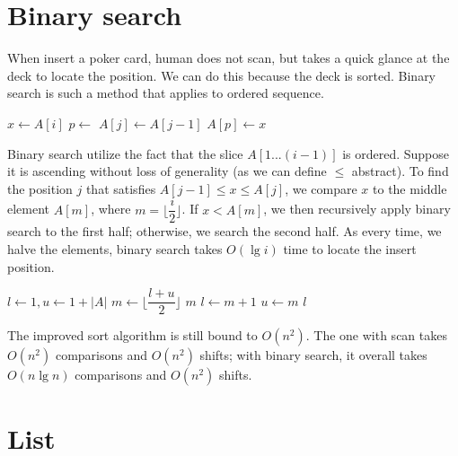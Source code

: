 \documentclass[b5paper]{article}
\begin{document}
\section{Binary search}

When insert a poker card, human does not scan, but takes a quick glance at the deck to locate the position. We can do this because the deck is sorted. Binary search is such a method that applies to ordered sequence.

\begin{algorithmic}[1]
    \State $x \gets A[i]$
    \State $p \gets $ 
      \State $A[j] \gets A[j-1]$
    \EndFor
    \State $A[p] \gets x$
  \EndFor
\EndFunction
\end{algorithmic}

Binary search utilize the fact that the slice $A[1...(i-1)]$ is ordered. Suppose it is ascending without loss of generality (as we can define $\leq$ abstract). To find the position $j$ that satisfies $A[j-1] \leq x \leq A[j]$, we compare $x$ to the middle element $A[m]$, where $m = \lfloor \dfrac{i}{2} \rfloor$. If $x < A[m]$, we then recursively apply binary search to the first half; otherwise, we search the second half. As every time, we halve the elements, binary search takes $O(\lg i)$ time to locate the insert position.

\begin{algorithmic}[1]
  \State $l \gets 1, u \gets 1+|A|$
    \State $m \gets \lfloor \dfrac{l+u}{2} \rfloor$
      \State \Return $m$ 
      \State $l \gets m+1$
    \Else
      \State $u \gets m$
    \EndIf
  \EndWhile
  \State \Return $l$
\EndFunction
\end{algorithmic}

The improved sort algorithm is still bound to $O(n^2)$. The one with scan takes $O(n^2)$ comparisons and $O(n^2)$ shifts; with binary search, it overall takes $O(n \lg n)$ comparisons and $O(n^2)$ shifts.

\begin{Exercise}
\end{Exercise}

\section{List}
\end{document}
